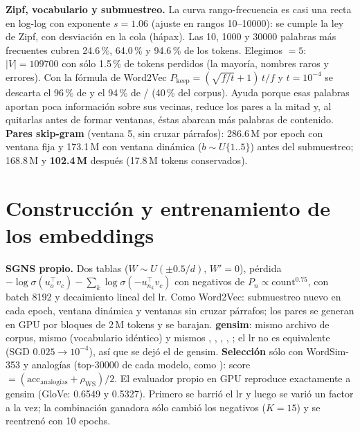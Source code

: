 \documentclass[10pt,letterpaper]{article}
\begin{document}
\textbf{Zipf, vocabulario y submuestreo.} La curva rango-frecuencia es casi una recta en log-log con exponente
$s=1.06$ (ajuste en rangos 10--\num{10000}): se cumple la ley de Zipf, con desviación en la cola (hápax). Las 10, \num{1000}
y \num{30000} palabras más frecuentes cubren 24.6\,\%, 64.0\,\% y 94.6\,\% de los tokens. Elegimos $=5$:
$|V|=\num{109700}$ con sólo 1.5\,\% de tokens perdidos (la mayoría, nombres raros y errores). Con la fórmula de Word2Vec
$P_\text{keep}=(\sqrt{f/t}+1)\,t/f$ y $t=10^{-4}$ se descarta el 96\,\% de  y el 94\,\% de /
(40\,\% del corpus). Ayuda porque esas palabras aportan poca información sobre sus vecinas, reduce los pares a la mitad y,
al quitarlas antes de formar ventanas, éstas abarcan más palabras de contenido. \textbf{Pares skip-gram} (ventana 5, sin
cruzar párrafos): 286.6\,M por epoch con ventana fija y 173.1\,M con ventana dinámica ($b\sim U\{1..5\}$) antes del
submuestreo; 168.8\,M y \textbf{102.4\,M} después (17.8\,M tokens conservados).

\section{Construcción y entrenamiento de los embeddings}
\textbf{SGNS propio.} Dos tablas  ($W\sim U(\pm0.5/d)$, $W'=0$), pérdida
$-\log\sigma(u_o^\top v_c)-\sum_{k}\log\sigma(-u_{n_k}^\top v_c)$ con negativos de $P_n\propto\text{count}^{0.75}$, 
con batch \num{8192} y decaimiento lineal del lr. Como Word2Vec: submuestreo nuevo en cada epoch, ventana dinámica y
ventanas sin cruzar párrafos; los pares se generan en GPU por bloques de 2\,M tokens y se barajan. \textbf{gensim}: mismo
archivo de corpus, mismo  (vocabulario idéntico) y mismos , , ,
, ; el lr no es equivalente (SGD $0.025\to10^{-4}$), así que se dejó el de gensim.
\textbf{Selección} sólo con WordSim-353 y analogías (top-\num{30000} de cada modelo, como ):
score $=(\text{acc}_\text{analogías}+\rho_\text{WS})/2$. El evaluador propio en GPU reproduce exactamente a gensim
(GloVe: 0.6549 y 0.5327). Primero se barrió el lr y luego se varió un factor a la vez; la combinación ganadora sólo
cambió los negativos ($K=15$) y se reentrenó con 10 epochs.
\end{document}
